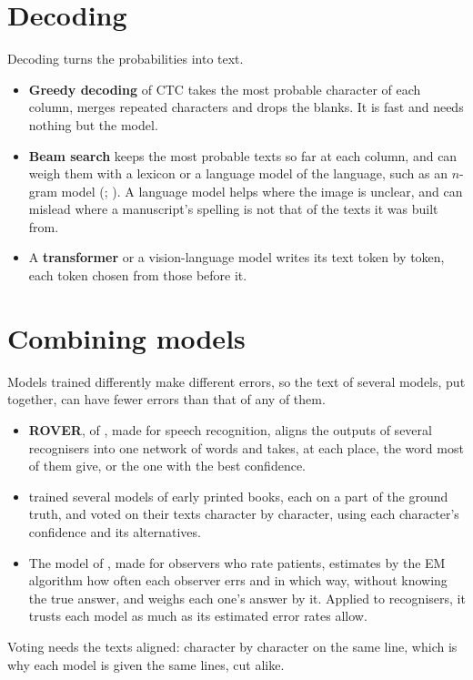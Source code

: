\section{Decoding}\label{sec:decoding}
Decoding turns the probabilities into text.
\begin{itemize}
  \item \textbf{Greedy decoding} of CTC takes the most probable character of each column, merges repeated
    characters and drops the blanks. It is fast and needs nothing but the model.
  \item \textbf{Beam search} keeps the most probable texts so far at each column, and can weigh them with a lexicon
    or a language model of the language, such as an $n$-gram model (;
    ). A language model helps where the image is unclear, and can mislead
    where a manuscript's spelling is not that of the texts it was built from.
  \item A \textbf{transformer} or a vision-language model writes its text token by token, each token chosen from
    those before it.
\end{itemize}

\section{Combining models}\label{sec:combining}
Models trained differently make different errors, so the text of several models, put together, can have fewer
errors than that of any of them.
\begin{itemize}
  \item \textbf{ROVER}, of , made for speech recognition, aligns the outputs of
    several recognisers into one network of words and takes, at each place, the word most of them give, or the one
    with the best confidence.
  \item {} trained several models of early printed books,
    each on a part of the ground truth, and voted on their texts character by character, using each character's
    confidence and its alternatives.
  \item The model of , made for observers who rate patients, estimates by the
    EM algorithm how often each observer errs and in which way, without knowing the true answer, and weighs each
    one's answer by it. Applied to recognisers, it trusts each model as much as its estimated error rates allow.
\end{itemize}
Voting needs the texts aligned: character by character on the same line, which is why each model is given the same
lines, cut alike.

